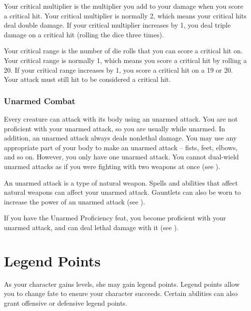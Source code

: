              Your critical multiplier is the multiplier you add to your damage when you score a critical hit.
            Your critical multiplier is normally 2, which means your critical hits deal double damage.
            If your critical multiplier increases by 1, you deal triple damage on a critical hit (rolling the dice three times).

             Your critical range is the number of die rolls that you can score a critical hit on.
            Your critical range is normally 1, which means you score a critical hit by rolling a 20.
            If your critical range increases by 1, you score a critical hit on a 19 or 20.
            Your attack must still hit to be considered a critical hit.

        \subsubsection{Unarmed Combat}\label{Unarmed Combat}
            Every creature can attack with its body using an unarmed attack.
            You are not proficient with your unarmed attack, so you are usually  while unarmed.
            In addition, an unarmed attack always deals nonlethal damage.
            You may use any appropriate part of your body to make an unarmed attack -- fists, feet, elbows, and so on.
            However, you only have one unarmed attack.
            You cannot dual-wield unarmed attacks as if you were fighting with two weapons at once (see ).

            An unarmed attack is a type of natural weapon.
            Spells and abilities that affect natural weapons can affect your unarmed attack.
            Gauntlets can also be worn to increase the power of an unarmed attack (see ).

            If you have the Unarmed Proficiency feat, you become proficient with your unarmed attack, and can deal lethal damage with it (see ).

\section{Legend Points}\label{Legend Points}

    As your character gains levels, she may gain legend points.
    Legend points allow you to change fate to ensure your character succeeds.
    Certain abilities can also grant offensive or defensive legend points.

